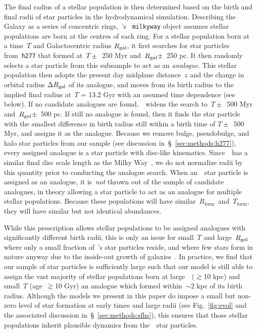 \documentclass[draft2.tex]{subfiles}
\begin{document}
\par 
The final radius of a stellar population is then determined based on the birth 
and final radii of star particles in the hydrodynamical simulation. 
Describing the Galaxy as a series of concentric rings,~\vice's~
\texttt{milkyway} object assumes stellar populations are born at the centres of 
each ring. 
For a stellar population born at a time~$T$ and Galactocentric radius 
$R_\text{gal}$, it first searches for star particles from~\texttt{h277} that 
formed at~$T \pm$~250 Myr and~$R_\text{gal} \pm$~250 pc. 
It then randomly selects a star particle from this subsample to act as an 
\textit{analogue}. 
This stellar population then adopts the {\color{red} present day midplane 
distance~$z$ and the} change in orbital radius 
$\Delta R_\text{gal}$ of its analogue, and moves from its birth radius to the 
implied final radius at~$T$ = 13.2 Gyr with an assumed time dependence (see 
below). 
If no candidate analogues are found,~\vice~widens the search to~$T \pm$~500 Myr 
and~$R_\text{gal} \pm$~500 pc. 
If still no analogue is found, then it finds the star particle with the 
smallest difference in birth radius still within a birth time of $T \pm$~500 
Myr, and assigns it as the analogue. 
{\color{red} 
Because we remove bulge, pseudobulge, and halo star particles from our sample 
(see discussion in~\S~\ref{sec:methods:h277}), every assigned analogue is a 
star particle with disc-like kinematics. 
Since~\hsim~has a similar final disc scale length as the Milky 
Way~\citep{Bird2021}, we do not normalize radii by this quantity prior to 
conducting the analogue search. 
When an~\hsim~star particle is assigned as an analogue, it is~\textit{not} 
thrown out of the sample of candidate analogues, in theory allowing a star 
particle to act as an analogue for multiple stellar populations. Because these 
populations will have similar~$R_\text{form}$~and~$T_\text{form}$, they will 
have similar but not identical abundances. 
}
\par 
While this prescription allows stellar populations to be assigned analogues 
with significantly different birth radii, this is only an issue for small~$T$ 
and large~$R_\text{gal}$ where {\color{red} only a small fraction of~\hsim's star 
particles reside,} 
and where few stars form in nature anyway due to the inside-out growth of 
galaxies~\citep[e.g.][]{Bird2013}. 
{\color{red} 
In practice, we find that our sample of star particles is sufficiently large 
such that our model is still able to assign the vast majority of stellar 
populations born at large~\rgal~($\gtrsim$10 kpc) and small~$T$ 
(age~$\gtrsim$10 Gyr) an analogue which formed within~$\sim$2 kpc of its birth 
radius. 
Although the models we present in this paper do impose a small but non-zero 
level of star formation at early times and large radii (see Fig.~\ref{fig:evol} 
and the associated discussion in~\S~\ref{sec:methods:sfhs}), this ensures that 
those stellar populations inherit plausible dynamics from the~\hsim~star 
particles. 
}
\end{document}
